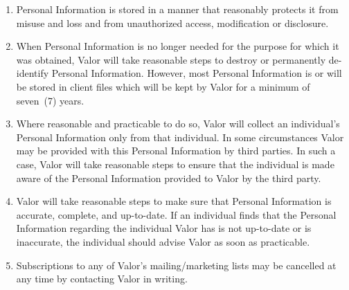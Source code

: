 \documentclass[10pt]{article}
\begin{document}
\begin{enumerate}[(1)]
\item
Personal Information is stored in a manner that reasonably protects it from misuse and loss and from unauthorized access, modification or disclosure.

\item
When Personal Information is no longer needed for the purpose for which it was obtained, Valor will take reasonable steps to destroy or permanently de-identify Personal Information. However, most Personal Information is or will be stored in client files which will be kept by Valor for a minimum of seven~(7) years.

\item
Where reasonable and practicable to do so, Valor will collect an individual's Personal Information only from that individual. In some circumstances Valor may be provided with this Personal Information by third parties. In such a case, Valor will take reasonable steps to ensure that the individual is made aware of the Personal Information provided to Valor by the third party.

\item
Valor will take reasonable steps to make sure that Personal Information is accurate, complete, and up-to-date. If an individual finds that the Personal Information regarding the individual Valor has is not up-to-date or is inaccurate, the individual should advise Valor as soon as practicable.

\item
Subscriptions to any of Valor's mailing/marketing lists may be cancelled at any time by contacting Valor in writing.
\end{enumerate}
\end{document}
